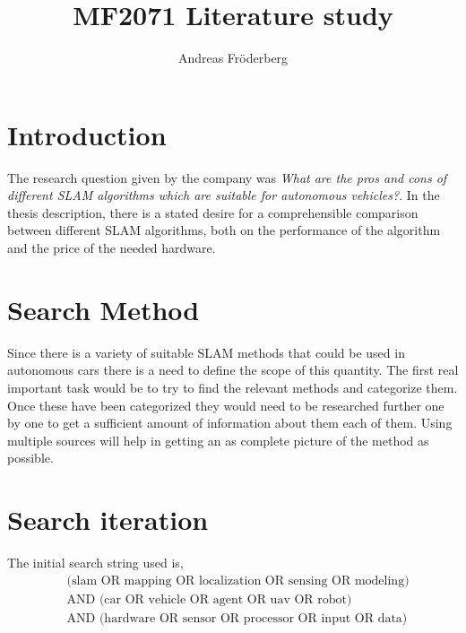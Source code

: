 \documentclass[a4paper, 12pt]{article}
\title{MF2071 Literature study}
\author{Andreas Fr\"{o}derberg}
\begin{document}
\maketitle
\pagebreak
\section*{Introduction}
The research question given by the company was \textit{What are the pros and 
    cons of different SLAM algorithms which are suitable for autonomous vehicles?}.
In the thesis description, there is a stated desire for a comprehensible 
comparison between different SLAM algorithms, both on the performance of the 
algorithm and the price of the needed hardware. 

\section{Search Method}
Since there is a variety of suitable SLAM methods that could be used in
autonomous cars there is a need to define the scope of this quantity. The first
real important task would be to try to find the relevant methods and categorize
them. Once these have been categorized they would need to be researched further
one by one to get a sufficient amount of information about them each of them.
Using multiple sources will help in getting an as complete picture of the
method as possible.

\pagebreak
\section*{Search iteration}

The initial search string used is,
\begin{align}
    &\text{(slam OR mapping OR localization OR sensing OR modeling)} \nonumber \\ 
    &\text{AND (car OR vehicle OR agent OR uav OR robot)} \\
    &\text{AND (hardware OR sensor OR processor OR input OR data)} \nonumber
\end{align}

\pagebreak


\end{document}
